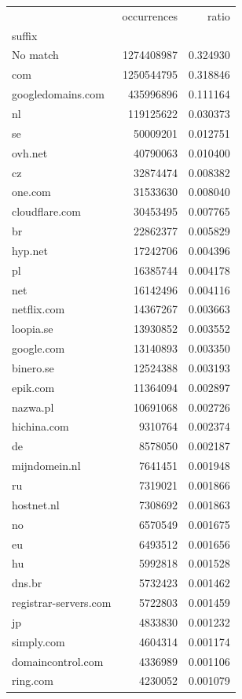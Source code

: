\begin{tabular}{lrr}
\toprule
 & occurrences & ratio \\
suffix &  &  \\
\midrule
No match & 1274408987 & 0.324930 \\
com & 1250544795 & 0.318846 \\
googledomains.com & 435996896 & 0.111164 \\
nl & 119125622 & 0.030373 \\
se & 50009201 & 0.012751 \\
ovh.net & 40790063 & 0.010400 \\
cz & 32874474 & 0.008382 \\
one.com & 31533630 & 0.008040 \\
cloudflare.com & 30453495 & 0.007765 \\
br & 22862377 & 0.005829 \\
hyp.net & 17242706 & 0.004396 \\
pl & 16385744 & 0.004178 \\
net & 16142496 & 0.004116 \\
netflix.com & 14367267 & 0.003663 \\
loopia.se & 13930852 & 0.003552 \\
google.com & 13140893 & 0.003350 \\
binero.se & 12524388 & 0.003193 \\
epik.com & 11364094 & 0.002897 \\
nazwa.pl & 10691068 & 0.002726 \\
hichina.com & 9310764 & 0.002374 \\
de & 8578050 & 0.002187 \\
mijndomein.nl & 7641451 & 0.001948 \\
ru & 7319021 & 0.001866 \\
hostnet.nl & 7308692 & 0.001863 \\
no & 6570549 & 0.001675 \\
eu & 6493512 & 0.001656 \\
hu & 5992818 & 0.001528 \\
dns.br & 5732423 & 0.001462 \\
registrar-servers.com & 5722803 & 0.001459 \\
jp & 4833830 & 0.001232 \\
simply.com & 4604314 & 0.001174 \\
domaincontrol.com & 4336989 & 0.001106 \\
ring.com & 4230052 & 0.001079 \\

\end{tabular}
